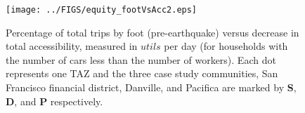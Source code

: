 \begin{figure}
\centering
\texttt{[image: ../FIGS/equity\_footVsAcc2.eps]} 
\caption{Percentage of total trips by foot (pre-earthquake) versus decrease in total accessibility, measured in $utils$ per day (for households with the number of cars less than the number of workers). Each dot represents one TAZ and the three case study communities, San Francisco financial district, Danville, and Pacifica are marked by \textbf{S}, \textbf{D}, and \textbf{P} respectively. }
\label{fig:walkingVsAcc}
\end{figure}



